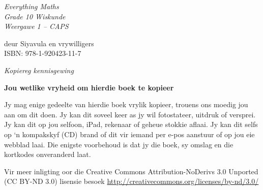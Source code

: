 \newpage
\thispagestyle{empty}
\mbox{}

\newpage
\begin{center}
    \thispagestyle{empty}

    \vspace*{4in}

    {\normalfont\sffamily\fontsize{36}\normalfont\itshape{Everything Maths } \\ \vspace*{1cm}
    {\normalfont\sffamily\fontsize{22}\normalfont\itshape{Grade 10 Wiskunde}}
    \vspace*{1in} \\
    \LARGE Weergawe 1 -- CAPS \\

   {\vspace*{2in}
     deur Siyavula en vrywilligers \\

ISBN: 978-1-920423-11-7
  

\vfill

    }}

\end{center}






\newpage
\thispagestyle{empty}
{
\begin{center}
\normalfont\sffamily\fontsize{22}\normalfont\itshape Kopiereg kennisgewing\\

\vspace*{1in}

\textbf{Jou wetlike vryheid om hierdie boek te kopieer}\\

\end{center}
}

{\LARGE
Jy mag enige gedeelte van hierdie boek vrylik kopieer, trouens ons moedig jou aan om dit doen. Jy kan dit soveel keer as jy wil fotostateer, uitdruk of versprei. Jy kan dit op jou selfoon, iPad, rekenaar of geheue stokkie aflaai. Jy kan dit selfs op ‘n kompakskyf (CD) brand of dit vir iemand per e-pos aanstuur of op jou eie webblad laai.
Die enigste voorbehoud is dat jy die boek, sy omslag en die kortkodes onveranderd laat. \par

Vir meer inligting oor die Creative Commons Attribution-NoDerivs 3.0 Unported (CC BY-ND
3.0) lisensie besoek \underline{http://creativecommons.org/licenses/by-nd/3.0/}}\\

